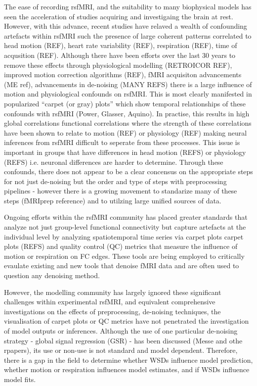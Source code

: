\documentclass[oneside]{zHenriquesLab-StyleBioRxiv}
\begin{document}
The ease of recording rsfMRI, and the suitability to many biophysical models has seen the acceleration of studies acquiring and investigaing the brain at rest. However, with this advance, recent studies have relaved a wealth of confounding artefacts within rsfMRI such the presence of large coherent patterns correlated to head motion (REF), heart rate variability (REF), respiration (REF), time of acqusition (REF). Although there have been efforts over the last 30 years to remove these effects through physiological modelling (RETROICOR REF), improved motion correction algorithms (REF), fMRI acquisiton advancements (ME ref), advancements in de-noising (MANY REFS) there is a large influence of motion and physiological confounds on rsfMRI. This is most clearly manifested in popularized ``carpet (or gray) plots'' which show temporal relationships of these confounds with rsfMRI (Power, Glasser, Aquino). In practise, this results in high global correlations functional correlations where the strength of these correlations have been shown to relate to motion (REF) or physiology (REF) making neural inferences from rsfMRI difficult to seperate from these processes. This issue is important in groups that have differences in head motion (REFS) or physiology (REFS) i.e. neuronal differences are harder to determine. Through these confounds, there does not appear to be a clear concensus on the appropriate steps for not just de-noising but the order and type of steps with preprocessing pipelines - however there is a growing movement to standarize many of these steps (fMRIprep reference) and to utilzing large unified sources of data.


Ongoing efforts within the rsfMRI community has placed greater standards that analyze not just group-level functional connectivity but capture artefacts at the individual level by analyzing spatiotemporal time series via carpet plots  carpet plots (REFS) and quality control (QC) metrics that measure the influence of motion or respiration on FC edges. These tools are being employed to critically evaulate existing and new tools that denoise fMRI data and are often used to question any denoising method. 


However, the modelling community has largely ignored these significant challenges within experimental rsfMRI, and equivalent comprehensive investigations on the effects of preprocessing, de-noising techniques, the visualisation of carpet plots or QC metrics have not penetrated the investigation of model outputs or inferences. Although the use of one particular de-noising strategy - global signal regression (GSR) - has been discussed (Messe and othe rpapers), its use or non-use is not standard and  model dependent. Therefore, there is a gap in the field to determine whether WSDs influence model prediction, whether motion or respiration influences model estimates, and if WSDs influence model fits. 
\end{document}
